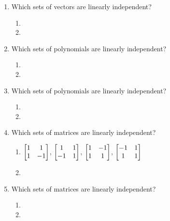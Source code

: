 \begin{enumerate}
	
\begin{enumerate}
	\item Which sets of vectors are linearly independent?
		\begin{enumerate}
			\item 
			\item 
		\end{enumerate}
	\item Which sets of polynomials are linearly independent?
		\begin{enumerate}
			\item 
			\item 
		\end{enumerate}
	\item Which sets of polynomials are linearly independent?
		\begin{enumerate}
			\item 
			\item 
		\end{enumerate}
	\item Which sets of matrices are linearly independent?
		\begin{enumerate}
			\item $\begin{bmatrix} 1&1\\1&-1 \end{bmatrix}$, $\begin{bmatrix} 1&1\\-1&1 \end{bmatrix}$, $\begin{bmatrix} 1&-1\\1&1 \end{bmatrix}$, $\begin{bmatrix} -1&1\\1&1 \end{bmatrix}$
			\item 
		\end{enumerate}
	\item Which sets of matrices are linearly independent?
		\begin{enumerate}
 			\item 
			\item 
		\end{enumerate}

\end{enumerate}
	
\end{enumerate}


